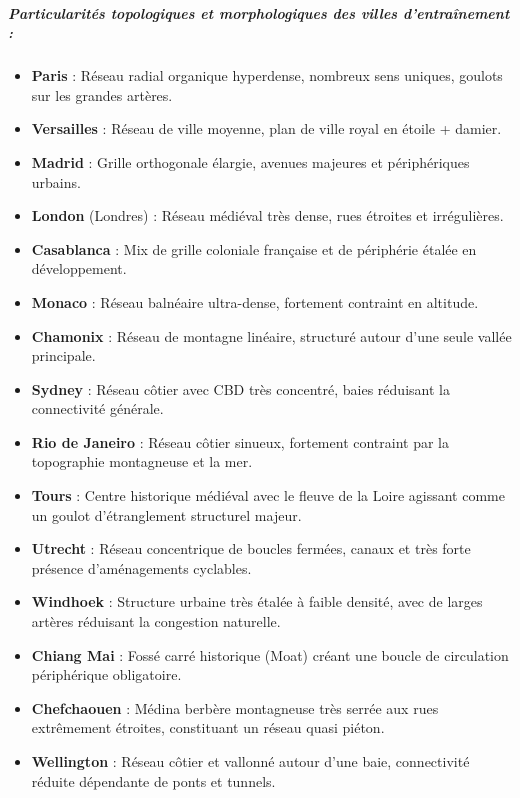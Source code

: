 \documentclass[10pt, a4paper]{article}
\providecommand{\tightlist}{}
\begin{document}
\subparagraph{Particularités topologiques et morphologiques des villes
d'entraînement
:}\label{particularituxe9s-topologiques-et-morphologiques-des-villes-dentrauxeenement}

\begin{itemize}
\tightlist
\item
  \textbf{Paris} : Réseau radial organique hyperdense, nombreux sens
  uniques, goulots sur les grandes artères.
\item
  \textbf{Versailles} : Réseau de ville moyenne, plan de ville royal en
  étoile + damier.
\item
  \textbf{Madrid} : Grille orthogonale élargie, avenues majeures et
  périphériques urbains.
\item
  \textbf{London} (Londres) : Réseau médiéval très dense, rues étroites
  et irrégulières.
\item
  \textbf{Casablanca} : Mix de grille coloniale française et de
  périphérie étalée en développement.
\item
  \textbf{Monaco} : Réseau balnéaire ultra-dense, fortement contraint en
  altitude.
\item
  \textbf{Chamonix} : Réseau de montagne linéaire, structuré autour
  d'une seule vallée principale.
\item
  \textbf{Sydney} : Réseau côtier avec CBD très concentré, baies
  réduisant la connectivité générale.
\item
  \textbf{Rio de Janeiro} : Réseau côtier sinueux, fortement contraint
  par la topographie montagneuse et la mer.
\item
  \textbf{Tours} : Centre historique médiéval avec le fleuve de la Loire
  agissant comme un goulot d'étranglement structurel majeur.
\item
  \textbf{Utrecht} : Réseau concentrique de boucles fermées, canaux et
  très forte présence d'aménagements cyclables.
\item
  \textbf{Windhoek} : Structure urbaine très étalée à faible densité,
  avec de larges artères réduisant la congestion naturelle.
\item
  \textbf{Chiang Mai} : Fossé carré historique (Moat) créant une boucle
  de circulation périphérique obligatoire.
\item
  \textbf{Chefchaouen} : Médina berbère montagneuse très serrée aux rues
  extrêmement étroites, constituant un réseau quasi piéton.
\item
  \textbf{Wellington} : Réseau côtier et vallonné autour d'une baie,
  connectivité réduite dépendante de ponts et tunnels.

\end{itemize}
\end{document}

